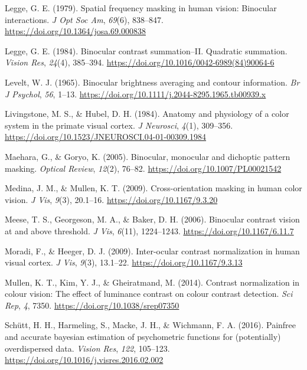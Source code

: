 \documentclass[
]{article}
\newlength{\cslhangindent}
\newlength{\cslentryspacingunit} %
\newenvironment{CSLReferences}[2] %
 {%
  \setlength{\parindent}{0pt}
  \ifodd #1
  \let\oldpar\par
  \def\par{\hangindent=\cslhangindent\oldpar}
  \fi
  \setlength{\parskip}{#2\cslentryspacingunit}
 }%
 {}
\begin{document}
\begin{CSLReferences}{1}{0}
\leavevmode{}%
Legge, G. E. (1979). Spatial frequency masking in human vision: Binocular interactions. \emph{J Opt Soc Am}, \emph{69}(6), 838--847. \url{https://doi.org/10.1364/josa.69.000838}

\leavevmode{}%
Legge, G. E. (1984). Binocular contrast summation--II. Quadratic summation. \emph{Vision Res}, \emph{24}(4), 385--394. \url{https://doi.org/10.1016/0042-6989(84)90064-6}

\leavevmode{}%
Levelt, W. J. (1965). Binocular brightness averaging and contour information. \emph{Br J Psychol}, \emph{56}, 1--13. \url{https://doi.org/10.1111/j.2044-8295.1965.tb00939.x}

\leavevmode{}%
Livingstone, M. S., \& Hubel, D. H. (1984). Anatomy and physiology of a color system in the primate visual cortex. \emph{J Neurosci}, \emph{4}(1), 309--356. \url{https://doi.org/10.1523/JNEUROSCI.04-01-00309.1984}

\leavevmode{}%
Maehara, G., \& Goryo, K. (2005). Binocular, monocular and dichoptic pattern masking. \emph{Optical Review}, \emph{12}(2), 76--82. \url{https://doi.org/10.1007/PL00021542}

\leavevmode{}%
Medina, J. M., \& Mullen, K. T. (2009). Cross-orientation masking in human color vision. \emph{J Vis}, \emph{9}(3), 20.1--16. \url{https://doi.org/10.1167/9.3.20}

\leavevmode{}%
Meese, T. S., Georgeson, M. A., \& Baker, D. H. (2006). Binocular contrast vision at and above threshold. \emph{J Vis}, \emph{6}(11), 1224--1243. \url{https://doi.org/10.1167/6.11.7}

\leavevmode{}%
Moradi, F., \& Heeger, D. J. (2009). Inter-ocular contrast normalization in human visual cortex. \emph{J Vis}, \emph{9}(3), 13.1--22. \url{https://doi.org/10.1167/9.3.13}

\leavevmode{}%
Mullen, K. T., Kim, Y. J., \& Gheiratmand, M. (2014). Contrast normalization in colour vision: The effect of luminance contrast on colour contrast detection. \emph{Sci Rep}, \emph{4}, 7350. \url{https://doi.org/10.1038/srep07350}

\leavevmode{}%
Schütt, H. H., Harmeling, S., Macke, J. H., \& Wichmann, F. A. (2016). Painfree and accurate bayesian estimation of psychometric functions for (potentially) overdispersed data. \emph{Vision Res}, \emph{122}, 105--123. \url{https://doi.org/10.1016/j.visres.2016.02.002}


\end{CSLReferences}
\end{document}
